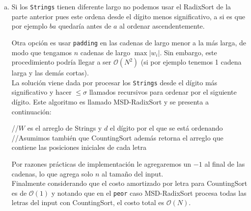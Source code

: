 \documentclass[dcc,uchile]{fcfmcourse}
\theoremstyle{plain}
\theoremstyle{definition}
\begin{document}
\begin{problems}
\begin{enumerate}[a)]
    \item Si los \texttt{Strings} tienen diferente largo no podemos usar el RadixSort de la parte anterior pues este ordena desde el dígito menos significativo, a si es que por ejemplo $ba$ quedaría antes de $a$ al ordenar ascendentemente.
    
    Otra opción es usar \texttt{padding} en las cadenas de largo menor a la más larga, de modo que tengamos $n$ cadenas de largo $\max{|w_{i}|}$. Sin embargo, este procedimiento podría llegar a ser $\mathcal{O}(N^2)$ (si por ejemplo tenemos 1 cadena larga y las demás cortas). \crying\\
    
    La solución viene dada por procesar los \texttt{Strings} desde el dígito más significativo y hacer $\le \sigma$ llamados recursivos para ordenar por el siguiente dígito. Este algoritmo es llamado MSD-RadixSort y se presenta a continuación:
    
    \begin{algorithm}[H]
        \SetAlgoLined
        //$W$ es el arreglo de Strings y $d$ el dígito por el que se está ordenando\\
        //Asumimos también que CountingSort además retorna el arreglo que contiene las posiciones iniciales de cada letra\\
    \end{algorithm}
    Por razones prácticas de implementación le agregaremos un $-1$ al final de las cadenas, lo que agrega solo $n$ al tamaño del input.\\
    Finalmente considerando que el costo amortizado por letra para CountingSort es de $\mathcal{O}(1)$ y notando que en el \texttt{peor} caso MSD-RadixSort procesa todas las letras del input con CountingSort, el costo total es $\mathcal{O}(N)$.
\end{enumerate}
\end{problems}
\end{document}

